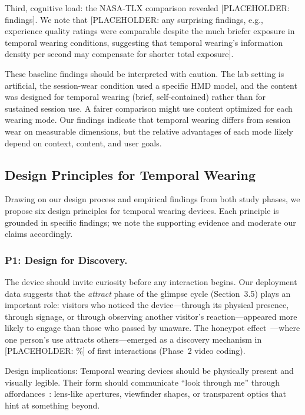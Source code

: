 Third, cognitive load: the NASA-TLX comparison revealed [PLACEHOLDER: findings]. We note that [PLACEHOLDER: any surprising findings, e.g., experience quality ratings were comparable despite the much briefer exposure in temporal wearing conditions, suggesting that temporal wearing's information density per second may compensate for shorter total exposure].

These baseline findings should be interpreted with caution. The lab setting is artificial, the session-wear condition used a specific HMD model, and the content was designed for temporal wearing (brief, self-contained) rather than for sustained session use. A fairer comparison might use content optimized for each wearing mode. Our findings indicate that temporal wearing differs from session wear on measurable dimensions, but the relative advantages of each mode likely depend on context, content, and user goals.

\subsection{Design Principles for Temporal Wearing}

Drawing on our design process and empirical findings from both study phases, we propose six design principles for temporal wearing devices. Each principle is grounded in specific findings; we note the supporting evidence and moderate our claims accordingly.

\subsubsection{P1: Design for Discovery.}
The device should invite curiosity before any interaction begins. Our deployment data suggests that the \textit{attract} phase of the glimpse cycle (Section~3.5) plays an important role: visitors who noticed the device---through its physical presence, through signage, or through observing another visitor's reaction---appeared more likely to engage than those who passed by unaware. The honeypot effect~\cite{wouters2016honeypot}---where one person's use attracts others---emerged as a discovery mechanism in [PLACEHOLDER: \%] of first interactions (Phase~2 video coding).

Design implications: Temporal wearing devices should be physically present and visually legible. Their form should communicate ``look through me'' through affordances~\cite{norman2013design}: lens-like apertures, viewfinder shapes, or transparent optics that hint at something beyond.

